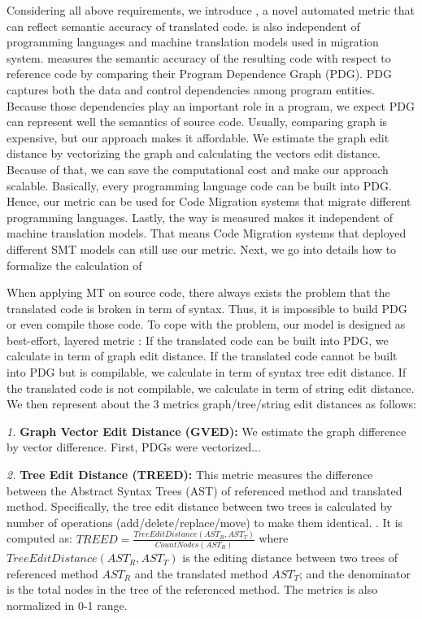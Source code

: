 Considering all above requirements, we introduce {\model}, a novel automated metric that can reflect semantic accuracy of translated code. {\model} is also independent of programming languages and machine translation models used in migration system. {\model} measures the semantic accuracy of the resulting code with respect to reference code by comparing their Program Dependence Graph (PDG). PDG captures both the data and control dependencies among program entities. Because those dependencies play an important role in a program, we expect PDG can represent well the semantics of source code. Usually, comparing graph is expensive, but our approach makes it affordable. We estimate the graph edit distance by vectorizing the graph and calculating the vectors edit distance. Because of that, we can save the computational cost and make our approach scalable. Basically, every programming language code can be built into PDG. Hence, our metric can be used for Code Migration systems that migrate different programming languages. Lastly, the way {\model} is measured makes it independent of machine translation models. That means Code Migration systems that deployed different SMT models can still use our metric. Next, we go into details how to formalize the calculation of {\model}


When applying MT on source code, there always exists the problem that the translated code is broken in term of syntax. Thus, it is impossible to build PDG or even compile those code. To cope with the problem, our model is designed as best-effort, layered metric  : If the translated code can be built into PDG, we calculate {\model} in term of graph edit distance. If the translated code cannot be built into PDG but is compilable, we calculate {\model} in term of syntax tree edit distance. If the translated code is not compilable, we calculate {\model} in term of string edit distance. We then represent about the 3 metrics graph/tree/string edit distances as follows:

\emph{1.} \textbf{Graph Vector Edit Distance (GVED):} We estimate the graph difference by vector difference. First, PDGs were vectorized...

\emph{2.} \textbf{Tree Edit Distance (TREED):} This metric measures the difference between the Abstract Syntax Trees (AST) of referenced method and translated method. Specifically, the tree edit distance between two trees is calculated by number of operations (add/delete/replace/move) to make them identical. \cite{algorithm}. 
It is computed as:  $TREED = \frac{TreeEditDistance\left(AST_R, AST_T\right)}{CountNodes \left(AST_R\right)}$ where $TreeEditDistance\left(AST_R, AST_T\right)$ is the editing distance between two trees of referenced method $AST_R$ and the translated method $AST_T$; and the denominator is the total nodes in the tree of the referenced method.  The metrics is also normalized in 0-1 range.

